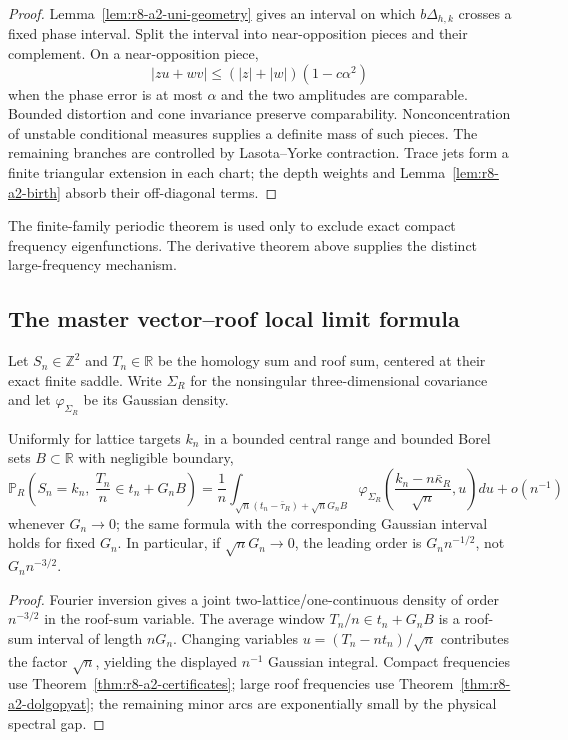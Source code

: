 \begin{proof}
Lemma~\ref{lem:r8-a2-uni-geometry} gives an interval on which
$b\Delta_{h,k}$ crosses a fixed phase interval.  Split the interval into
near-opposition pieces and their complement.  On a near-opposition piece,
\[
 |zu+wv|\le(|z|+|w|)(1-c\alpha^2)
\]
when the phase error is at most $\alpha$ and the two amplitudes are comparable.
Bounded distortion and cone invariance preserve comparability.  Nonconcentration
of unstable conditional measures supplies a definite mass of such pieces.
The remaining branches are controlled by Lasota--Yorke contraction.  Trace
jets form a finite triangular extension in each chart; the depth weights and
Lemma~\ref{lem:r8-a2-birth} absorb their off-diagonal terms.
\end{proof}

The finite-family periodic theorem is used only to exclude exact compact
frequency eigenfunctions.  The derivative theorem above supplies the distinct
large-frequency mechanism.

\subsection{The master vector--roof local limit formula}

Let $S_n\in\mathbb Z^2$ and $T_n\in\mathbb R$ be the homology sum and roof sum,
centered at their exact finite saddle.  Write $\Sigma_R$ for the nonsingular
three-dimensional covariance and let $\varphi_{\Sigma_R}$ be its Gaussian
density.

\begin{theorem}
\label{thm:r8-a2-llt}
Uniformly for lattice targets $k_n$ in a bounded central range and bounded
Borel sets $B\subset\mathbb R$ with negligible boundary,
\[
 \mathbb P_R\!\left(
 S_n=k_n,\ \frac{T_n}{n}\in t_n+G_nB
 \right)
 =\frac{1}{n}\int_{\sqrt n(t_n-\bar\tau_R)+\sqrt n G_nB}
 \varphi_{\Sigma_R}\!\left(
 \frac{k_n-n\bar\kappa_R}{\sqrt n},u
 \right)du+o(n^{-1})
\]
whenever $G_n\to0$; the same formula with the corresponding Gaussian interval
holds for fixed $G_n$.  In particular, if $\sqrt nG_n\to0$, the leading order
is $G_n n^{-1/2}$, not $G_n n^{-3/2}$.
\end{theorem}

\begin{proof}
Fourier inversion gives a joint two-lattice/one-continuous density of order
$n^{-3/2}$ in the roof-sum variable.  The average window
$T_n/n\in t_n+G_nB$ is a roof-sum interval of length $nG_n$.  Changing variables
$u=(T_n-nt_n)/\sqrt n$ contributes the factor $\sqrt n$, yielding the displayed
$n^{-1}$ Gaussian integral.  Compact frequencies use
Theorem~\ref{thm:r8-a2-certificates}; large roof frequencies use
Theorem~\ref{thm:r8-a2-dolgopyat}; the remaining minor arcs are exponentially
small by the physical spectral gap.
\end{proof}

